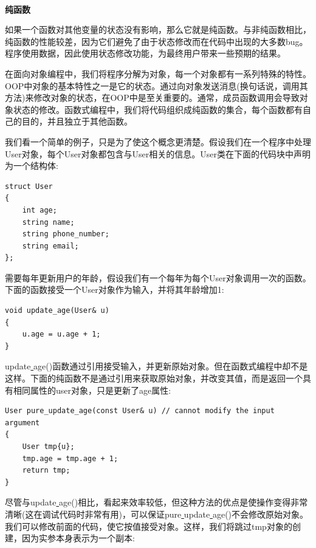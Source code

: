 \noindent\textbf{}\ \par
\textbf{纯函数} \ \par
如果一个函数对其他变量的状态没有影响，那么它就是纯函数。与非纯函数相比，纯函数的性能较差，因为它们避免了由于状态修改而在代码中出现的大多数bug。程序使用数据，因此使用状态修改功能，为最终用户带来一些预期的结果。 \par
在面向对象编程中，我们将程序分解为对象，每一个对象都有一系列特殊的特性。OOP中对象的基本特性之一是它的状态。通过向对象发送消息(换句话说，调用其方法)来修改对象的状态，在OOP中是至关重要的。通常，成员函数调用会导致对象状态的修改。函数式编程中，我们将代码组织成纯函数的集合，每个函数都有自己的目的，并且独立于其他函数。 \par
我们看一个简单的例子，只是为了使这个概念更清楚。假设我们在一个程序中处理User对象，每个User对象都包含与User相关的信息。User类在下面的代码块中声明为一个结构体: \par

\begin{lstlisting}[caption={}]
struct User
{
	int age;
	string name;
	string phone_number;
	string email;
};
\end{lstlisting}

需要每年更新用户的年龄，假设我们有一个每年为每个User对象调用一次的函数。下面的函数接受一个User对象作为输入，并将其年龄增加1: \par

\begin{lstlisting}[caption={}]
void update_age(User& u)
{
	u.age = u.age + 1;
}
\end{lstlisting}

update\underline{ }age()函数通过引用接受输入，并更新原始对象。但在函数式编程中却不是这样。下面的纯函数不是通过引用来获取原始对象，并改变其值，而是返回一个具有相同属性的user对象，只是更新了age属性: \par

\begin{lstlisting}[caption={}]
User pure_update_age(const User& u) // cannot modify the input argument
{
	User tmp{u};
	tmp.age = tmp.age + 1;
	return tmp;
}
\end{lstlisting}

尽管与update\underline{ }age()相比，看起来效率较低，但这种方法的优点是使操作变得非常清晰(这在调试代码时非常有用)，可以保证pure\underline{ }update\underline{ }age()不会修改原始对象。我们可以修改前面的代码，使它按值接受对象。这样，我们将跳过tmp对象的创建，因为实参本身表示为一个副本: \par

